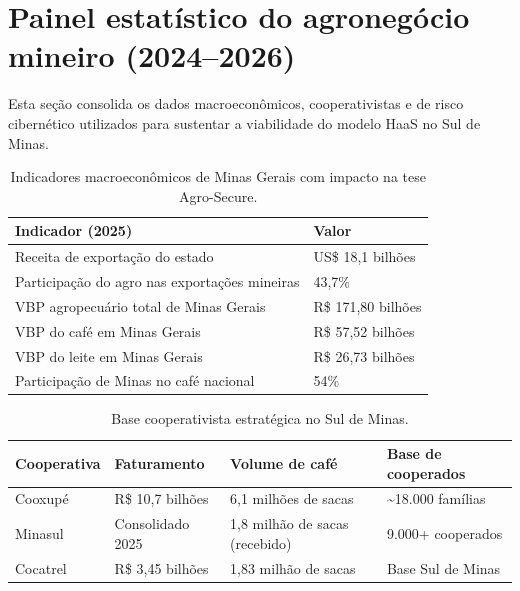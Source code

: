 \section{Painel estatístico do agronegócio mineiro (2024--2026)}
\noindent Esta seção consolida os dados macroeconômicos, cooperativistas e de risco cibernético utilizados para sustentar a viabilidade do modelo HaaS no Sul de Minas.

\begin{table}[H]
\centering
\caption{Indicadores macroeconômicos de Minas Gerais com impacto na tese Agro-Secure.}
\begin{tabular}{|p{6.4cm}|p{5.1cm}|}
\hline
\textbf{Indicador (2025)} & \textbf{Valor} \\
\hline
Receita de exportação do estado & US\$ 18,1 bilhões \\
\hline
Participação do agro nas exportações mineiras & 43,7\% \\
\hline
VBP agropecuário total de Minas Gerais & R\$ 171,80 bilhões \\
\hline
VBP do café em Minas Gerais & R\$ 57,52 bilhões \\
\hline
VBP do leite em Minas Gerais & R\$ 26,73 bilhões \\
\hline
Participação de Minas no café nacional & 54\% \\
\hline
\end{tabular}
\end{table}

\begin{table}[H]
\centering
\caption{Base cooperativista estratégica no Sul de Minas.}
\begin{tabular}{|p{2.6cm}|p{3.3cm}|p{2.9cm}|p{3.0cm}|}
\hline
\textbf{Cooperativa} & \textbf{Faturamento} & \textbf{Volume de café} & \textbf{Base de cooperados} \\
\hline
Cooxupé & R\$ 10,7 bilhões & 6,1 milhões de sacas & \textasciitilde 18.000 famílias \\
\hline
Minasul & Consolidado 2025 & 1,8 milhão de sacas (recebido) & 9.000+ cooperados \\
\hline
Cocatrel & R\$ 3,45 bilhões & 1,83 milhão de sacas & Base Sul de Minas \\
\hline
\end{tabular}
\end{table}

